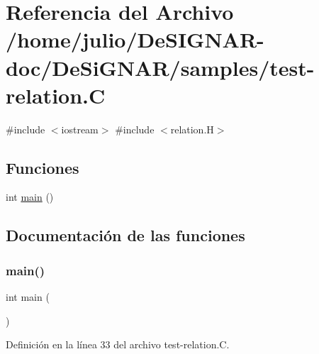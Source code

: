 \hypertarget{test-relation_8_c}{}\section{Referencia del Archivo /home/julio/\+De\+S\+I\+G\+N\+A\+R-\/doc/\+De\+Si\+G\+N\+A\+R/samples/test-\/relation.C}
\label{test-relation_8_c}
{\ttfamily \#include $<$iostream$>$}\newline
{\ttfamily \#include $<$relation.\+H$>$}\newline
\subsection*{Funciones}
\begin{DoxyCompactItemize}
\item 
int \hyperlink{test-relation_8_c_ae66f6b31b5ad750f1fe042a706a4e3d4}{main} ()
\end{DoxyCompactItemize}


\subsection{Documentación de las funciones}
\mbox{\label{test-relation_8_c_ae66f6b31b5ad750f1fe042a706a4e3d4}} 
\subsubsection{\texorpdfstring{main()}{main()}}
{\footnotesize\ttfamily int main (\begin{DoxyParamCaption}{ }\end{DoxyParamCaption})}



Definición en la línea 33 del archivo test-\/relation.\+C.

